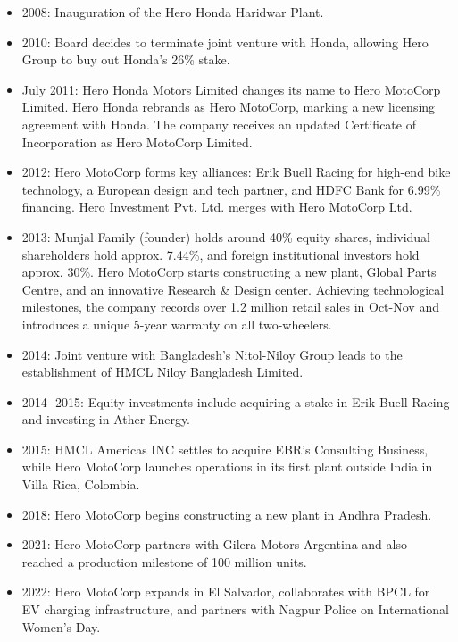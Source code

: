 \begin{itemize}
	\item 2008:
	Inauguration of the Hero Honda Haridwar Plant.
	
	\item 2010:
	Board decides to terminate joint venture with Honda, allowing Hero Group to buy out Honda's 26\% stake.
	
	\item July 2011:
	Hero Honda Motors Limited changes its name to Hero MotoCorp Limited. Hero Honda rebrands as Hero MotoCorp, marking a new licensing agreement with Honda. The company receives an updated Certificate of Incorporation as Hero MotoCorp Limited.
	
	\item 2012:
	Hero MotoCorp forms key alliances: Erik Buell Racing for high-end bike technology, a European design and tech partner, and HDFC Bank for 6.99\% financing. Hero Investment Pvt. Ltd. merges with Hero MotoCorp Ltd.
	
	\item 2013:
	Munjal Family (founder) holds around 40\% equity shares, individual shareholders hold approx. 7.44\%, and foreign institutional investors hold approx. 30\%.
	Hero MotoCorp starts constructing a new plant, Global Parts Centre, and an innovative Research \& Design center. Achieving technological milestones, the company records over 1.2 million retail sales in Oct-Nov and introduces a unique 5-year warranty on all two-wheelers.
	
	\item 2014:
	Joint venture with Bangladesh's Nitol-Niloy Group leads to the establishment of HMCL Niloy Bangladesh Limited.
	
	\item 2014- 2015:
	Equity investments include acquiring a stake in Erik Buell Racing and investing in Ather Energy.
	
	\item 2015:
	HMCL Americas INC settles to acquire EBR's Consulting Business, while Hero MotoCorp launches operations in its first plant outside India in Villa Rica, Colombia.
	
	\item 2018:
	Hero MotoCorp begins constructing a new plant in Andhra Pradesh.
	
	\item 2021:
	Hero MotoCorp partners with Gilera Motors Argentina and also reached a production milestone of 100 million units.
	
	\item 2022:
	Hero MotoCorp expands in El Salvador, collaborates with BPCL for EV charging infrastructure, and partners with Nagpur Police on International Women's Day.
\end{itemize}